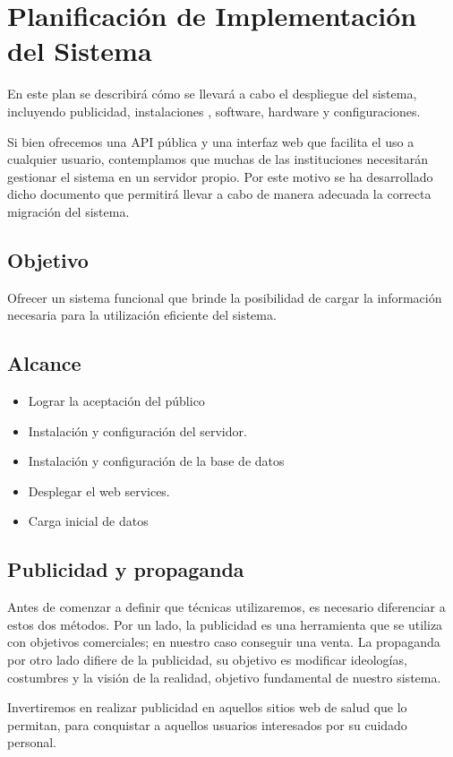 \section{Planificación de Implementación del Sistema}
En este plan se describirá cómo se llevará a cabo el despliegue del sistema, incluyendo publicidad, instalaciones , software, hardware y configuraciones.

Si bien ofrecemos una API pública y una interfaz web que facilita el uso a cualquier usuario, contemplamos que muchas de las instituciones necesitarán gestionar el sistema en un servidor propio. Por este motivo se ha desarrollado dicho documento que permitirá llevar a cabo de manera adecuada la correcta migración del sistema.

\subsection{Objetivo}


Ofrecer un sistema funcional que brinde la posibilidad de cargar la información necesaria para la utilización eficiente del sistema.
\subsection{Alcance}
\begin{itemize}
	\item Lograr la aceptación del público
	\item Instalación y configuración del servidor.
	\item Instalación y configuración de la base de datos
	\item Desplegar el web services.
	\item Carga inicial de datos
\end{itemize}

\subsection{Publicidad y propaganda}

Antes de comenzar a definir que técnicas utilizaremos, es necesario diferenciar a estos dos métodos. Por un lado, la publicidad es una herramienta que se utiliza con objetivos comerciales; en nuestro caso conseguir una venta. La propaganda por otro lado difiere de la publicidad, su objetivo es modificar ideologías, costumbres y la visión de la realidad, objetivo fundamental de nuestro sistema.

Invertiremos en realizar publicidad en aquellos sitios web de salud que lo permitan, para conquistar a aquellos usuarios interesados por su cuidado personal.

